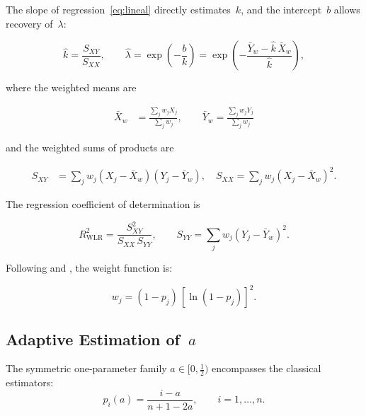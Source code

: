 \documentclass[APA,STIX1COL]{WileyNJD-v2}
\begin{document}
\medskip

The slope of regression~\eqref{eq:lineal} directly estimates~$k$,
and the intercept~$b$ allows recovery of~$\lambda$:

\begin{equation}\label{eq:parametros}
\hat{k} = \frac{S_{XY}}{S_{XX}},\qquad
\hat{\lambda} = \exp\!\left(-\frac{b}{k}\right)
              = \exp\!\left(-\frac{\bar{Y}_w - \hat{k}\,\bar{X}_w}
                                   {\hat{k}}\right),
\end{equation}

\medskip

where the weighted means are

\begin{align}
\bar{X}_w &= \frac{\sum_j w_j X_j}{\sum_j w_j},\qquad
\bar{Y}_w  = \frac{\sum_j w_j Y_j}{\sum_j w_j}
\end{align}

\medskip

and the weighted sums of products are

\begin{align}
S_{XY} &= \sum_j w_j(X_j - \bar{X}_w)(Y_j - \bar{Y}_w),\quad
S_{XX}  = \sum_j w_j(X_j - \bar{X}_w)^2.\label{eq:sumas_w}
\end{align}

\medskip
The regression coefficient of determination is

\begin{equation}\label{eq:R2_wlr}
R^2_{\mathrm{WLR}} = \frac{S_{XY}^2}{S_{XX}\,S_{YY}},\qquad
S_{YY} = \sum_j w_j(Y_j - \bar{Y}_w)^2.
\end{equation}

\medskip

Following \citet{olivera2019} and \citet{bergman1986}, the weight
function is:

\begin{equation}\label{eq:peso_A}
w_j = (1 - p_j)\,[\ln(1-p_j)]^2.
\end{equation}

\subsection{Adaptive Estimation of~$a$}\label{subsec:familia}

The symmetric one-parameter family $a\in[0,\tfrac{1}{2})$
encompasses the classical estimators:
\begin{equation}\label{eq:familia}
p_i(a) = \frac{i-a}{n + 1 - 2a},\qquad i=1,\ldots,n.
\end{equation}
\end{document}
